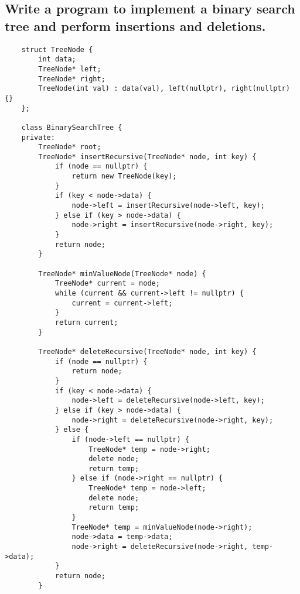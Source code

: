 \subsection{Write a program to implement a binary search tree and perform insertions and deletions.}
\begin{tcolorbox}[title=]
\begin{verbatim}
    struct TreeNode {
        int data;
        TreeNode* left;
        TreeNode* right;
        TreeNode(int val) : data(val), left(nullptr), right(nullptr) {}
    };
    
    class BinarySearchTree {
    private:
        TreeNode* root;
        TreeNode* insertRecursive(TreeNode* node, int key) {
            if (node == nullptr) {
                return new TreeNode(key);
            }
            if (key < node->data) {
                node->left = insertRecursive(node->left, key);
            } else if (key > node->data) {
                node->right = insertRecursive(node->right, key);
            }
            return node;
        }
    
        TreeNode* minValueNode(TreeNode* node) {
            TreeNode* current = node;
            while (current && current->left != nullptr) {
                current = current->left;
            }
            return current;
        }
    
        TreeNode* deleteRecursive(TreeNode* node, int key) {
            if (node == nullptr) {
                return node;
            }
            if (key < node->data) {
                node->left = deleteRecursive(node->left, key);
            } else if (key > node->data) {
                node->right = deleteRecursive(node->right, key);
            } else {
                if (node->left == nullptr) {
                    TreeNode* temp = node->right;
                    delete node;
                    return temp;
                } else if (node->right == nullptr) {
                    TreeNode* temp = node->left;
                    delete node;
                    return temp;
                }
                TreeNode* temp = minValueNode(node->right);
                node->data = temp->data;
                node->right = deleteRecursive(node->right, temp->data);
            }
            return node;
        }
\end{verbatim}
\end{tcolorbox}
